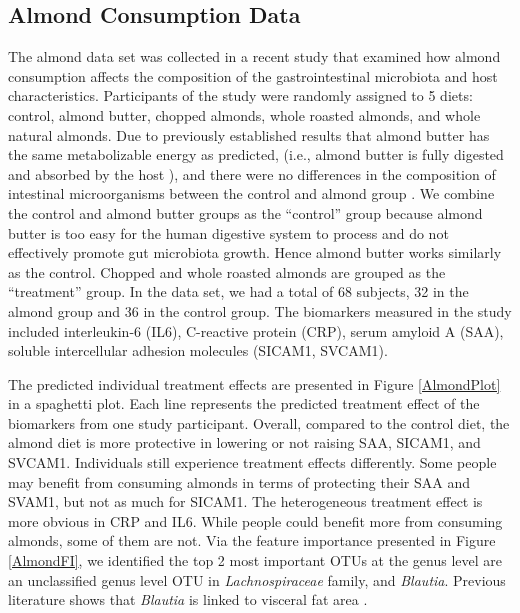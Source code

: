 \documentclass[smallextended]{svjour3}
\begin{document}
\subsection{Almond Consumption Data}
The almond data set was collected in a recent study \citep{holscher2018almond} that examined how almond consumption affects the composition of the gastrointestinal microbiota and host characteristics. Participants of the study were randomly assigned to 5 diets: control, almond butter, chopped almonds, whole roasted almonds, and whole natural almonds. Due to previously established results that almond butter has the same metabolizable energy as predicted, (i.e., almond butter is fully digested and absorbed by the host \citep{gebauer2016food}), and there were no differences in the composition of intestinal microorganisms between the control and almond group \citep{holscher2018almond}. We combine the control and almond butter groups as the ``control'' group because almond butter is too easy for the human digestive system to process and do not effectively promote gut microbiota growth. Hence almond butter works similarly as the control. Chopped and whole roasted almonds are grouped as the ``treatment'' group. In the data set, we had a total of 68 subjects, 32 in the almond group and 36 in the control group. The biomarkers measured in the study included interleukin-6 (IL6), C-reactive protein (CRP), serum amyloid A (SAA), soluble intercellular adhesion molecules (SICAM1, SVCAM1).

The predicted individual treatment effects are presented in Figure \ref{AlmondPlot} in a spaghetti plot. Each line represents the predicted treatment effect of the biomarkers from one study participant. Overall, compared to the control diet, the almond diet is more protective in lowering or not raising SAA, SICAM1, and SVCAM1. Individuals still experience treatment effects differently. Some people may benefit from consuming almonds in terms of protecting their SAA and SVAM1, but not as much for SICAM1. The heterogeneous treatment effect is more obvious in CRP and IL6. While people could benefit more from consuming almonds, some of them are not. Via the feature importance presented in Figure \ref{AlmondFI}, we identified the top 2 most important OTUs at the genus level are an unclassified genus level OTU in \textit{Lachnospiraceae} family, and \textit{Blautia}. Previous literature shows that \textit{Blautia} is linked to visceral fat area \citep{ozato2019blautia}.
\end{document}
